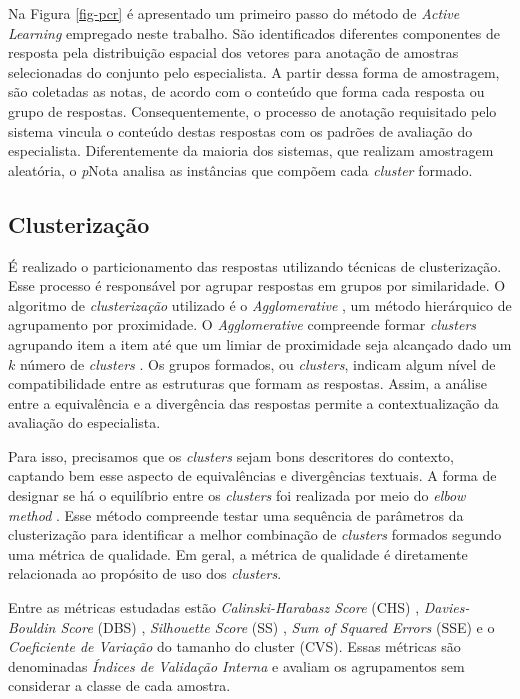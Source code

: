 Na Figura \ref{fig-pcr} é apresentado um primeiro passo do método de \textit{Active Learning} empregado neste trabalho. São identificados diferentes componentes de resposta pela distribuição espacial dos vetores para anotação de amostras selecionadas do conjunto pelo especialista. A partir dessa forma de amostragem, são coletadas as notas, de acordo com o conteúdo que forma cada resposta ou grupo de respostas. Consequentemente, o processo de anotação requisitado pelo sistema vincula o conteúdo destas respostas com os padrões de avaliação do especialista. Diferentemente da maioria dos sistemas, que realizam amostragem aleatória, o \textit{p}Nota analisa as instâncias que compõem cada \textit{cluster} formado.


\subsection{Clusterização}
\label{subsec-clusterizacao}

É realizado o particionamento das respostas utilizando técnicas de clusterização. Esse processo é responsável por agrupar respostas em grupos por similaridade. O algoritmo de \textit{clusterização} utilizado é o \textit{Agglomerative} \cite{spalenza2019}, um método hierárquico de agrupamento por proximidade. O \textit{Agglomerative} compreende formar \textit{clusters} agrupando item a item até que um limiar de proximidade seja alcançado dado um $ k $ número de \textit{clusters} \cite{everitt2011}. Os grupos formados, ou \textit{clusters}, indicam algum nível de compatibilidade entre as estruturas que formam as respostas. Assim, a análise entre a equivalência e a divergência das respostas permite a contextualização da avaliação do especialista.

Para isso, precisamos que os \textit{clusters} sejam bons descritores do contexto, captando bem esse aspecto de equivalências e divergências textuais. A forma de designar se há o equilíbrio entre os \textit{clusters} foi realizada por meio do \textit{elbow method} \cite{everitt2011}. Esse método compreende testar uma sequência de parâmetros da clusterização para identificar a melhor combinação de \textit{clusters} formados segundo uma métrica de qualidade. Em geral, a métrica de qualidade é diretamente relacionada ao propósito de uso dos \textit{clusters}.

Entre as métricas estudadas estão \textit{Calinski-Harabasz Score} (CHS) \cite{calinskiharabasz1974}, \textit{Davies-Bouldin Score} (DBS) \cite{daviesbouldin1979}, \textit{Silhouette Score} (SS) \cite{rousseeuw1987}, \textit{Sum of Squared Errors} (SSE) \cite{maimon2005} e o \textit{Coeficiente de Variação} do tamanho do cluster (CVS). Essas métricas são denominadas \textit{Índices de Validação Interna} e avaliam os agrupamentos sem considerar a classe de cada amostra.

